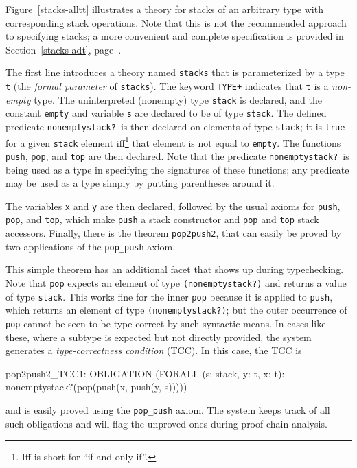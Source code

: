 Figure~\ref{stacks-alltt} illustrates a theory for stacks of an arbitrary
type with corresponding stack operations.  Note that this is not the
recommended approach to specifying stacks; a more convenient and complete
specification is provided in Section~\ref{stacks-adt},
page~\pageref{stacks-adt}.

The first line introduces a theory named \texttt{stacks} that is
parameterized by a type \texttt{t} (the \emph{formal parameter} of
\texttt{stacks}).  The keyword \texttt{TYPE+} indicates that \texttt{t} is
a \emph{non-empty} type.  The uninterpreted (nonempty) type \texttt{stack}
is declared, and the constant \texttt{empty} and variable \texttt{s} are
declared to be of type \texttt{stack}.  The defined predicate
\texttt{nonemptystack?}~is then declared on elements of type
\texttt{stack}; it is \texttt{true} for a given \texttt{stack} element
iff\footnote{Iff is short for ``if and only if''.} that element is not
equal to \texttt{empty}.  The functions \texttt{push}, \texttt{pop}, and
\texttt{top} are then declared.  Note that the predicate
\texttt{nonemptystack?}~is being used as a type in specifying the
signatures of these functions; any predicate may be used as a type simply
by putting parentheses around it.

The variables \texttt{x} and \texttt{y} are then declared, followed by the
usual axioms for \texttt{push}, \texttt{pop}, and \texttt{top}, which make
\texttt{push} a stack constructor and \texttt{pop} and \texttt{top} stack
accessors.  Finally, there is the theorem \texttt{pop2push2}, that can
easily be proved by two applications of the \texttt{pop\_push} axiom.

This simple theorem has an additional facet that shows up during
typechecking.  Note that \texttt{pop} expects an element of type
\texttt{(nonemptystack?)} and returns a value of type \texttt{stack}.
This works fine for the inner \texttt{pop} because it is applied to
\texttt{push}, which returns an element of type \texttt{(nonemptystack?)};
but the outer occurrence of \texttt{pop} cannot be seen to be type correct
by such syntactic means.  In cases like these, where a subtype is expected
but not directly provided, the system generates a \emph{type-correctness
condition} (TCC).  In this case, the TCC is
\begin{pvsex}
  pop2push2_TCC1: OBLIGATION
    (FORALL (s: stack, y: t, x: t):
      nonemptystack?(pop(push(x, push(y, s)))))
\end{pvsex}
and is easily proved using the \texttt{pop\_push} axiom.  The system keeps
track of all such obligations and will flag the unproved ones during proof
chain analysis.

